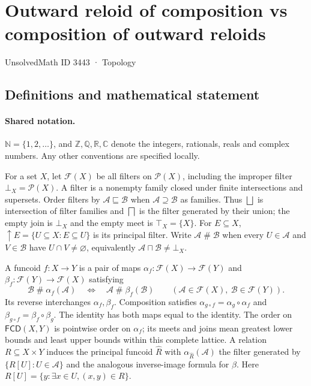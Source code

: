 \documentclass[11pt]{article}
\begin{document}
\setcounter{section}{3442}
\section{Outward reloid of composition vs composition of outward reloids}\label{3443}
{\small\sffamily UnsolvedMath ID 3443 · Topology}
\subsection{Definitions and mathematical statement}

\paragraph{Shared notation.}$\mathbb N=\{1,2,\ldots\}$, and $\mathbb Z,\mathbb Q,\mathbb R,\mathbb C$ denote the integers, rationals, reals and complex numbers. Any other conventions are specified locally.


For a set $X$, let $\mathcal F(X)$ be all filters on $\mathcal P(X)$, including the improper filter $\bot_X=\mathcal P(X)$. A filter is a nonempty family closed under finite intersections and supersets. Order filters by $\mathcal A\sqsubseteq\mathcal B$ when $\mathcal A\supseteq\mathcal B$ as families. Thus $\bigsqcup$ is intersection of filter families and $\bigsqcap$ is the filter generated by their union; the empty join is $\bot_X$ and the empty meet is $\top_X=\{X\}$. For $E\subseteq X$, $\uparrow E=\{U\subseteq X:E\subseteq U\}$ is its principal filter. Write $\mathcal A\mathrel{\#}\mathcal B$ when every $U\in\mathcal A$ and $V\in\mathcal B$ have $U\cap V\ne\varnothing$, equivalently $\mathcal A\sqcap\mathcal B\ne\bot_X$.

A funcoid $f:X\to Y$ is a pair of maps $\alpha_f:\mathcal F(X)\to\mathcal F(Y)$ and $\beta_f:\mathcal F(Y)\to\mathcal F(X)$ satisfying
\[
 \mathcal B\mathrel{\#}\alpha_f(\mathcal A)
 \quad\Longleftrightarrow\quad
 \mathcal A\mathrel{\#}\beta_f(\mathcal B)
 \qquad(\mathcal A\in\mathcal F(X),\ \mathcal B\in\mathcal F(Y)).
\]
Its reverse interchanges $\alpha_f,\beta_f$. Composition satisfies $\alpha_{g\circ f}=\alpha_g\circ\alpha_f$ and $\beta_{g\circ f}=\beta_f\circ\beta_g$. The identity has both maps equal to the identity. The order on $\mathsf{FCD}(X,Y)$ is pointwise order on $\alpha_f$; its meets and joins mean greatest lower bounds and least upper bounds within this complete lattice. A relation $R\subseteq X\times Y$ induces the principal funcoid $\widehat R$ with $\alpha_{\widehat R}(\mathcal A)$ the filter generated by $\{R[U]:U\in\mathcal A\}$ and the analogous inverse-image formula for $\beta$. Here $R[U]=\{y:\exists x\in U,(x,y)\in R\}$.
\end{document}
